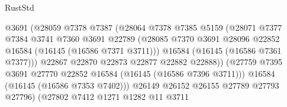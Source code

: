 \begin{lexlean}{RustStd}
\begin{coremodule}
                                        @3691
                                        (@28059
                                          @7378
                                          @7387
                                          (@28064
                                            @7378
                                            @7385
                                            @5159
                                            (@28071
                                              @7377
                                              @7384
                                              @3741
                                              @7360
                                              @3691
                                              @22789
                                              (@28085
                                                @7370
                                                @3691
                                                @28096
                                                @22852
                                                @16584
                                                (@16145 (@16586 @7371 @3711)))
                                              @16584
                                              (@16145 (@16586 @7361 @7377)))
                                            @22867
                                            @22870
                                            @22873
                                            @22877
                                            @22882
                                            @22888))
                                        (@27759
                                          @7395
                                          @3691
                                          @27770
                                          @22852
                                          @16584
                                          (@16145 (@16586 @7396 @3711)))
                                        @16584
                                        (@16145 (@16586 @7353 @7402)))
                                      @26149
                                      @26152
                                      @26155
                                      @27789
                                      @27793
                                      @27796)
                                    (@27802
                                      @7412
                                      @1271
                                      @1282
                                      @11
                                      @3711

\end{coremodule}
\end{lexlean}

